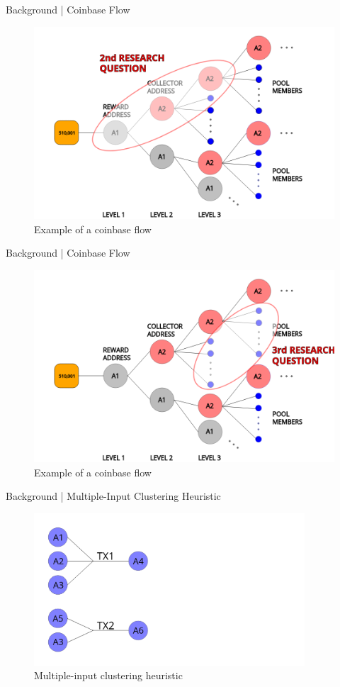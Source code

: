 \documentclass[10pt]{beamer}
\begin{document}
\begin{frame}[fragile]{Background | Coinbase Flow}
    \begin{figure}
        \includegraphics[width=.8\textwidth]{images/2rq.png}
        \\Example of a coinbase flow
    \end{figure}
\end{frame}

\begin{frame}[fragile]{Background | Coinbase Flow}
    \begin{figure}
        \includegraphics[width=.8\textwidth]{images/3rq.png}
        \\Example of a coinbase flow
    \end{figure}
\end{frame}

\begin{frame}[fragile]{Background | Multiple-Input Clustering Heuristic}
    \begin{figure}
        \centering
        \includegraphics[width=0.9\textwidth]{images/clustering1.png}
        \\Multiple-input clustering heuristic
    \end{figure}
\end{frame}
\end{document}
